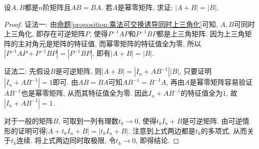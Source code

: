 \documentclass[../../main.tex]{subfiles}%
\begin{document}
\begin{example}
设\(A,B\)都是\(n\)阶矩阵且\(AB = BA\). 若\(A\)是幂零矩阵, 求证: \(|A + B| = |B|\).
\end{example}
\begin{proof}

{\color{blue}证法一:} 由\hyperref[proposition:乘法可交换诱导同时上三角化]{命题\ref{proposition:乘法可交换诱导同时上三角化}}可知, \(A,B\)可同时上三角化, 即存在可逆矩阵\(P\), 使得\(P^{-1}AP\)和\(P^{-1}BP\)都是上三角矩阵. 因为上三角矩阵的主对角元是矩阵的特征值, 而幂零矩阵的特征值全为零, 所以\(|P^{-1}AP + P^{-1}BP| = |P^{-1}BP|\), 即有\(|A + B| = |B|\).
    
{\color{blue}证法二:} 先假设\(B\)是可逆矩阵, 则\(|A + B| = |I_{n}+AB^{-1}||B|\), 只要证明\(|I_{n}+AB^{-1}| = 1\)即可. 由\(AB = BA\)可知\(AB^{-1}=B^{-1}A\), 再由\(A\)是幂零矩阵容易验证\(AB^{-1}\)也是幂零矩阵, 从而其特征值全为零. 因此\(I_{n}+AB^{-1}\)的特征值全为\(1\), 故\(|I_{n}+AB^{-1}| = 1\). 
    
对于一般的矩阵\(B\), 可取到一列有理数\(t_{k}\to 0\), 使得\(t_{k}I_{n}+B\)是可逆矩阵. 由可逆情形的证明可得\(|A + t_{k}I_{n}+B| = |t_{k}I_{n}+B|\). 注意到上式两边都是\(t_{k}\)的多项式, 从而关于\(t_{k}\)连续. 将上式两边同时取极限, 令\(t_{k}\to 0\), 即得结论.

\end{proof}
\end{document}

